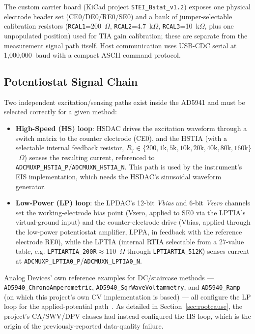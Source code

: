 \documentclass[preprint,12pt]{elsarticle}
\begin{document}
The custom carrier board (KiCad project \texttt{STEI\_Bstat\_v1.2}) exposes one physical electrode header set (CE0/DE0/RE0/SE0) and a bank of jumper-selectable calibration resistors (\texttt{RCAL1}=200~$\Omega$, \texttt{RCAL2}=4.7~k$\Omega$, \texttt{RCAL3}=10~k$\Omega$, plus one unpopulated position) used for TIA gain calibration; these are separate from the measurement signal path itself. Host communication uses USB-CDC serial at 1{,}000{,}000~baud with a compact ASCII command protocol.

\subsection{Potentiostat Signal Chain}
Two independent excitation/sensing paths exist inside the AD5941 and must be selected correctly for a given method:
\begin{itemize}
\item \textbf{High-Speed (HS) loop}: HSDAC drives the excitation waveform through a switch matrix to the counter electrode (CE0), and the HSTIA (with a selectable internal feedback resistor, $R_{f}\in\{200,1\text{k},5\text{k},10\text{k},20\text{k},40\text{k},80\text{k},160\text{k}\}$~$\Omega$) senses the resulting current, referenced to \texttt{ADCMUXP\_HSTIA\_P}/\texttt{ADCMUXN\_HSTIA\_N}. This path is used by the instrument's EIS implementation, which needs the HSDAC's sinusoidal waveform generator.
\item \textbf{Low-Power (LP) loop}: the LPDAC's 12-bit \emph{Vbias} and 6-bit \emph{Vzero} channels set the working-electrode bias point (Vzero, applied to SE0 via the LPTIA's virtual-ground input) and the counter-electrode drive (Vbias, applied through the low-power potentiostat amplifier, LPPA, in feedback with the reference electrode RE0), while the LPTIA (internal RTIA selectable from a 27-value table, e.g. \texttt{LPTIARTIA\_200R}$\approx$110~$\Omega$ through \texttt{LPTIARTIA\_512K}) senses current at \texttt{ADCMUXP\_LPTIA0\_P}/\texttt{ADCMUXN\_LPTIA0\_N}.
\end{itemize}
Analog Devices' own reference examples for DC/staircase methods --- \texttt{AD5940\_ChronoAmperometric}, \texttt{AD5940\_SqrWaveVoltammetry}, and \texttt{AD5940\_Ramp} (on which this project's own CV implementation is based) --- all configure the LP loop for the applied-potential path~\cite{ref:ad5940examples}. As detailed in Section~\ref{sec:rootcause}, the project's CA/SWV/DPV classes had instead configured the HS loop, which is the origin of the previously-reported data-quality failure.
\end{document}

